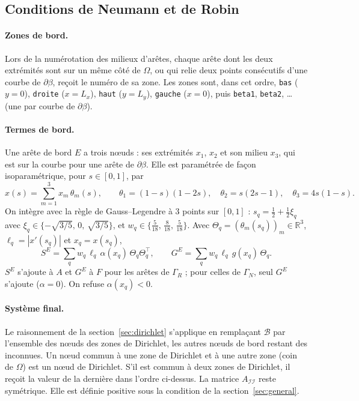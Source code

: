 \documentclass[11pt,a4paper]{article}
\begin{document}
\subsection{Conditions de Neumann et de Robin}
\label{sec:robin}

\paragraph{Zones de bord.} Lors de la numérotation des milieux d'arêtes, chaque
arête dont les deux extrémités sont sur un même côté de $\Omega$, ou qui relie
deux points consécutifs d'une courbe de $\partial\beta$, reçoit le numéro de
sa zone. Les zones sont, dans cet ordre, \texttt{bas} ($y = 0$),
\texttt{droite} ($x = L_x$), \texttt{haut} ($y = L_y$), \texttt{gauche}
($x = 0$), puis \texttt{beta1}, \texttt{beta2}, \dots{} (une par courbe de
$\partial\beta$).

\paragraph{Termes de bord.} Une arête de bord $E$ a trois nœuds : ses extrémités
$x_1$, $x_2$ et son milieu $x_3$, qui est sur la courbe pour une arête de
$\partial\beta$. Elle est paramétrée de façon isoparamétrique, pour
$s \in [0, 1]$, par
\[
x(s) = \sum_{m=1}^{3} x_m\, \theta_m(s),
\qquad
\theta_1 = (1 - s)(1 - 2s), \quad \theta_2 = s(2s - 1), \quad \theta_3 = 4 s (1 - s).
\]
On intègre avec la règle de Gauss--Legendre à 3 points sur $[0, 1]$ :
$s_q = \tfrac12 + \tfrac12 \xi_q$ avec $\xi_q \in \{-\sqrt{3/5},\, 0,\, \sqrt{3/5}\}$,
et $w_q \in \{\tfrac{5}{18},\, \tfrac{8}{18},\, \tfrac{5}{18}\}$. Avec
$\Theta_q = (\theta_m(s_q))_m \in \mathbb{R}^3$,
$\ell_q = |x'(s_q)|$ et $x_q = x(s_q)$,
\[
S^E = \sum_{q} w_q\, \ell_q\, \alpha(x_q)\, \Theta_q \Theta_q^{\top},
\qquad
G^E = \sum_{q} w_q\, \ell_q\, g(x_q)\, \Theta_q .
\]
$S^E$ s'ajoute à $A$ et $G^E$ à $F$ pour les arêtes de $\Gamma_R$ ; pour celles
de $\Gamma_N$, seul $G^E$ s'ajoute ($\alpha = 0$). On refuse $\alpha(x_q) < 0$.

\paragraph{Système final.} Le raisonnement de la section~\ref{sec:dirichlet}
s'applique en remplaçant $\mathcal{B}$ par l'ensemble des nœuds des zones de
Dirichlet, les autres nœuds de bord restant des inconnues. Un nœud commun à
une zone de Dirichlet et à une autre zone (coin de $\Omega$) est un nœud de
Dirichlet. S'il est commun à deux zones de Dirichlet, il reçoit la valeur de
la dernière dans l'ordre ci-dessus. La matrice $A_{\mathcal{I}\mathcal{I}}$
reste symétrique. Elle est définie positive sous la condition de la
section~\ref{sec:general}.
\end{document}

